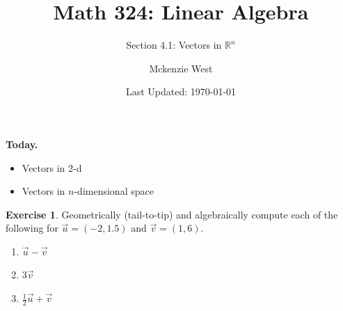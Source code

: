 \documentclass{beamer}
\newcommand{\R}{\mathbb{R}}
\newcommand{\fn}{\insertframenumber}
\theoremstyle{definition}
\newtheorem{exercise}{Exercise}
\begin{document}
	\title{Math 324: Linear Algebra}
	\subtitle{Section 4.1: Vectors in $\R^n$}
	\author{Mckenzie West}
	\date{Last Updated: \today}
\begin{frame}
\maketitle
\end{frame}

\begin{frame}{\insertframenumber}
	\begin{block}{\textbf{Today.}}
		\begin{itemize}[label=--]
			\item Vectors in 2-d
			\item Vectors in $n$-dimensional space
		\end{itemize}
	\end{block}
\end{frame}
\begin{frame}{\fn}
	\begin{exercise}
		Geometrically (tail-to-tip) and algebraically compute each of the following for $\vec{u}=(-2,1.5)$ and $\vec{v}=(1,6)$.
			\begin{enumerate}[label=(\alph*)]
				\item $\vec{u}-\vec{v}$
				\item $3\vec{v}$
				\item $\frac{1}{2}\vec{u}+\vec{v}$
			\end{enumerate}
	\end{exercise}
\end{frame}
\end{document}
